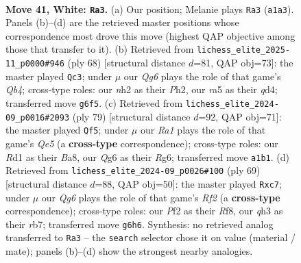 \documentclass[11pt]{article}
\begin{document}
\clearpage

\begin{figure}[p]\centering
\begin{subfigure}{0.46\textwidth}\centering
\resizebox{\linewidth}{!}{%
\newchessgame
\chessboard[
  setfen={2r3k1/6p1/1p4Q1/r2pn3/P3p2N/7q/2P2P1n/R2R2K1 w - - 4 41},
  showmover=false,
  pgfstyle=straightmove, color=movearrow, markmove={a1-a3}
]}
\caption{}
\end{subfigure}\hfill
\begin{subfigure}{0.46\textwidth}\centering
\resizebox{\linewidth}{!}{%
\newchessgame
\chessboard[
  setfen={4r1k1/R6p/1r4p1/3p1n2/1Qpq1P2/7N/1P5P/R6K w - - 1 35},
  showmover=false,
  pgfstyle=straightmove, color=movearrow, markmove={b4-c3}
]}
\caption{}
\end{subfigure}
\\[4pt]
\begin{subfigure}{0.46\textwidth}\centering
\resizebox{\linewidth}{!}{%
\newchessgame
\chessboard[
  setfen={b7/7k/4p1rp/p3N1P1/P2Pqr2/1P5R/3Q3K/6R1 b - - 1 40},
  showmover=false,
  pgfstyle=straightmove, color=movearrow, markmove={e4-f5}
]}
\caption{}
\end{subfigure}\hfill
\begin{subfigure}{0.46\textwidth}\centering
\resizebox{\linewidth}{!}{%
\newchessgame
\chessboard[
  setfen={5r1k/1RR2r2/1n2p2p/1P1pPq2/3P1p2/5QP1/3N2P1/6K1 b - - 0 35},
  showmover=false,
  pgfstyle=straightmove, color=movearrow, markmove={f7-c7}
]}
\caption{}
\end{subfigure}
\caption{\textbf{Move 41, White: \texttt{Ra3}.} (a) Our position; Melanie plays \texttt{Ra3} (\texttt{a1a3}). Panels (b)--(d) are the retrieved master positions whose correspondence most drove this move (highest QAP objective among those that transfer to it). (b) Retrieved from \texttt{lichess\_elite\_2025-11\_p0000\#946} (ply 68) [structural distance $d$=81, QAP obj=73]: the master played \texttt{Qc3}; under $\mu$ our \emph{Qg6} plays the role of that game's \emph{Qb4}; cross-type roles: our \emph{n}h2 as their \emph{P}h2, our \emph{r}a5 as their \emph{q}d4; transferred move \texttt{g6f5}. (c) Retrieved from \texttt{lichess\_elite\_2024-09\_p0016\#2093} (ply 79) [structural distance $d$=92, QAP obj=71]: the master played \texttt{Qf5}; under $\mu$ our \emph{Ra1} plays the role of that game's \emph{Qe5} (a \textbf{cross-type} correspondence); cross-type roles: our \emph{R}d1 as their \emph{B}a8, our \emph{Q}g6 as their \emph{R}g6; transferred move \texttt{a1b1}. (d) Retrieved from \texttt{lichess\_elite\_2024-09\_p0026\#100} (ply 69) [structural distance $d$=88, QAP obj=50]: the master played \texttt{Rxc7}; under $\mu$ our \emph{Qg6} plays the role of that game's \emph{Rf2} (a \textbf{cross-type} correspondence); cross-type roles: our \emph{P}f2 as their \emph{R}f8, our \emph{q}h3 as their \emph{r}b7; transferred move \texttt{g6h6}. Synthesis: no retrieved analog transferred to \texttt{Ra3} -- the \texttt{search} selector chose it on value (material / mate); panels (b)--(d) show the strongest nearby analogies.}
\label{fig:thought-m80}
\end{figure}
\end{document}
